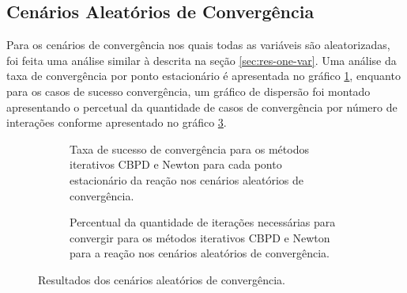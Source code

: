 \subsection{Cenários Aleatórios de Convergência}

Para os cenários de convergência nos quais todas as variáveis são aleatorizadas, foi feita uma análise similar à descrita na seção \ref{sec:res-one-var}. Uma análise da taxa de convergência por ponto estacionário é apresentada no gráfico \ref{fig:result-mult-var-conv-tax}, enquanto para os casos de sucesso convergência, um gráfico de dispersão foi montado apresentando o percetual da quantidade de casos de convergência por número de interações conforme apresentado no gráfico \ref{fig:result-mult-var-conv-metric}.

\begin{figure}
  \begin{subfigure}{.5\textwidth}
    \begin{center}
    
    \end{center}
    \caption{Taxa de sucesso de convergência para os métodos iterativos CBPD e Newton para cada ponto estacionário da reação  nos cenários aleatórios de convergência.}
    \label{fig:result-mult-var-conv-tax}
  \end{subfigure}%
  \begin{subfigure}{.5\textwidth}
    \begin{center}
    
    \end{center}
    \caption{Percentual da quantidade de iterações necessárias para convergir para os métodos iterativos CBPD e Newton para a reação  nos cenários aleatórios de convergência.}
    \label{fig:result-mult-var-conv-metric}
  \end{subfigure}
  \caption{Resultados dos cenários aleatórios de convergência.}
\end{figure}
